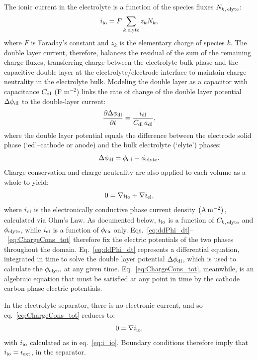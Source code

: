 \documentclass{elsarticle}
\begin{document}
The ionic current in the electrolyte is a function of the species fluxes $N_{k,\,{\rm elyte}}$:
\begin{equation}\label{eq:i_io}
    i_{\rm io} = F\sum_{k,{\rm elyte}} z_kN_{k},
\end{equation}
where $F$ is Faraday's constant and $z_k$ is the elementary charge of species $k$. The double layer current, therefore, balances the residual of the sum of the remaining charge fluxes, transferring charge between the electrolyte bulk phase and the capacitive double layer at the electrolyte/electrode interface to maintain charge neutrality in the electrolyte bulk. Modeling the double layer as a capacitor with capacitance $C_{\rm dl}$ (F m$^{-2}$) links the rate of change of the double layer potential $\Delta \phi_{\rm dl}$ to the double-layer current:
\begin{equation}\label{eq:ddPhi_dt}
    \frac{\partial \Delta \phi_{\rm dl}}{\partial t} = \frac{i_{\rm dl}}{C_{\rm dl}\,a_{\rm dl}},
\end{equation}
where the double layer potential equals the difference between the electrode solid phase (`ed'--cathode or anode) and the bulk electrolyte (`elyte') phases:
\begin{equation}\label{eq:dPhi_dl}
    \Delta \phi_{\rm dl} = \phi_{\rm ed} - \phi_{\rm elyte}.
\end{equation}
Charge conservation and charge neutrality are also applied to each volume as a whole to yield:
\begin{equation}\label{eq:ChargeCons_tot}
    0 = \nabla i_{\rm io} + \nabla i_{\rm el},
\end{equation}
where $i_{\rm el}$ is the electronically conductive phase current density $\left({\rm A\,m^{-2}} \right)$, calculated via Ohm's Law. As documented below, $i_{\rm io}$ is a function of $C_{k,\,{\rm elyte}}$ and $\phi_{\rm elyte}$, while $i_{\rm el}$ is a function of $\phi_{\rm ca}$ only.  Eqs.~\ref{eq:ddPhi_dt}--~\ref{eq:ChargeCons_tot} therefore fix the electric potentials of the two phases throughout the domain. Eq.~\ref{eq:ddPhi_dt} represents a differential equation, integrated in time to solve the double layer potential $\Delta \phi_{\rm dl}$, which is used to calculate the $\phi_{\rm elyte}$ at any given time. Eq.~\ref{eq:ChargeCons_tot}, meanwhile, is an algebraic equation that must be satisfied at any point in time by the cathode carbon phase electric potentials. 

In the electrolyte separator, there is no electronic current, and so eq.~\ref{eq:ChargeCons_tot} reduces to:
\begin{equation}
    0 = \nabla i_{\rm io},
\end{equation}
with $i_{\rm io}$ calculated as in eq.~\ref{eq:i_io}. Boundary conditions therefore imply that $i_{\rm io} = i_{\rm ext}$, in the separator.
\end{document}
